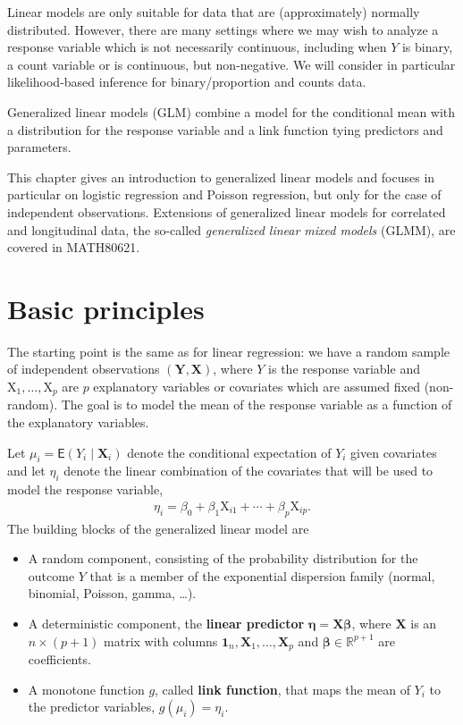 \documentclass[
  11pt,
  letterpaper,
]{book}
\providecommand{\tightlist}{%
  \setlength{\itemsep}{0pt}\setlength{\parskip}{0pt}}
\theoremstyle{definition}
\theoremstyle{definition}
\theoremstyle{definition}
\theoremstyle{remark}
\begin{document}
Linear models are only suitable for data that are (approximately) normally distributed. However, there are many settings where we may wish to analyze a response variable which is not necessarily continuous, including when \(Y\) is binary, a count variable or is continuous, but non-negative. We will consider in particular likelihood-based inference for binary/proportion and counts data.

Generalized linear models (GLM) combine a model for the conditional mean with a distribution for the response variable and a link function tying predictors and parameters.

This chapter gives an introduction to generalized linear models and focuses in particular on logistic regression and Poisson regression, but only for the case of independent observations. Extensions of generalized linear models for correlated and longitudinal data, the so-called \emph{generalized linear mixed models} (GLMM), are covered in MATH80621.

\hypertarget{basic-principles}{%
\section{Basic principles}\label{basic-principles}}

The starting point is the same as for linear regression: we have a random sample of independent observations \((\boldsymbol{Y}, \mathbf{X})\), where \(Y\) is the response variable and \(\mathrm{X}_1, \ldots, \mathrm{X}_p\) are \(p\) explanatory variables or covariates which are assumed fixed (non-random). The goal is to model the mean of the response variable as a function of the explanatory variables.

Let \(\mu_i=\mathsf{E}(Y_i \mid \mathbf{X}_i)\) denote the conditional expectation of \(Y_i\) given covariates and let \(\eta_i\) denote the linear combination of the covariates that will be used to model the response variable,
\begin{align*}
\eta_i=\beta_0 + \beta_1 \mathrm{X}_{i1} + \cdots + \beta_p \mathrm{X}_{ip}.
\end{align*}
The building blocks of the generalized linear model are

\begin{itemize}
\tightlist
\item
  A random component, consisting of the probability distribution for the outcome \(Y\) that is a member of the exponential dispersion family (normal, binomial, Poisson, gamma, \ldots).
\item
  A deterministic component, the \textbf{linear predictor} \(\boldsymbol{\eta}=\mathbf{X} \boldsymbol{\beta}\), where \(\mathbf{X}\) is an \(n\times (p+1)\) matrix with columns \(\mathbf{1}_n, \mathbf{X}_1, \ldots, \mathbf{X}_p\) and \(\boldsymbol{\beta} \in \mathbb{R}^{p+1}\) are coefficients.
\item
  A monotone function \(g\), called \textbf{link function}, that maps the mean of \(Y_i\) to the predictor variables, \(g(\mu_i)=\eta_i\).
\end{itemize}
\end{document}
